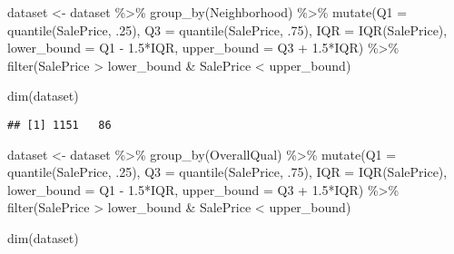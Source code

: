 \documentclass[
]{article}
\newenvironment{Shaded}{\begin{snugshade}}{\end{snugshade}}
\newcommand{\AttributeTok}[1]{\textcolor[rgb]{0.77,0.63,0.00}{#1}}
\newcommand{\DecValTok}[1]{\textcolor[rgb]{0.00,0.00,0.81}{#1}}
\newcommand{\FloatTok}[1]{\textcolor[rgb]{0.00,0.00,0.81}{#1}}
\newcommand{\FunctionTok}[1]{\textcolor[rgb]{0.00,0.00,0.00}{#1}}
\newcommand{\NormalTok}[1]{#1}
\newcommand{\OtherTok}[1]{\textcolor[rgb]{0.56,0.35,0.01}{#1}}
\newcommand{\SpecialCharTok}[1]{\textcolor[rgb]{0.00,0.00,0.00}{#1}}
\begin{document}
\begin{Shaded}
\begin{Highlighting}[]
\NormalTok{dataset }\OtherTok{\textless{}{-}}\NormalTok{ dataset }\SpecialCharTok{\%\textgreater{}\%} 
  \FunctionTok{group\_by}\NormalTok{(Neighborhood) }\SpecialCharTok{\%\textgreater{}\%} 
  \FunctionTok{mutate}\NormalTok{(}\AttributeTok{Q1 =} \FunctionTok{quantile}\NormalTok{(SalePrice, .}\DecValTok{25}\NormalTok{),}
         \AttributeTok{Q3 =} \FunctionTok{quantile}\NormalTok{(SalePrice, .}\DecValTok{75}\NormalTok{),}
         \AttributeTok{IQR =} \FunctionTok{IQR}\NormalTok{(SalePrice),}
         \AttributeTok{lower\_bound =}\NormalTok{ Q1 }\SpecialCharTok{{-}} \FloatTok{1.5}\SpecialCharTok{*}\NormalTok{IQR,}
         \AttributeTok{upper\_bound =}\NormalTok{ Q3 }\SpecialCharTok{+} \FloatTok{1.5}\SpecialCharTok{*}\NormalTok{IQR) }\SpecialCharTok{\%\textgreater{}\%}
  \FunctionTok{filter}\NormalTok{(SalePrice }\SpecialCharTok{\textgreater{}}\NormalTok{ lower\_bound }\SpecialCharTok{\&}\NormalTok{ SalePrice }\SpecialCharTok{\textless{}}\NormalTok{ upper\_bound)}

\FunctionTok{dim}\NormalTok{(dataset)}
\end{Highlighting}
\end{Shaded}

\begin{verbatim}
## [1] 1151   86
\end{verbatim}

\begin{Shaded}
\begin{Highlighting}[]
\NormalTok{dataset }\OtherTok{\textless{}{-}}\NormalTok{ dataset }\SpecialCharTok{\%\textgreater{}\%} 
  \FunctionTok{group\_by}\NormalTok{(OverallQual) }\SpecialCharTok{\%\textgreater{}\%} 
  \FunctionTok{mutate}\NormalTok{(}\AttributeTok{Q1 =} \FunctionTok{quantile}\NormalTok{(SalePrice, .}\DecValTok{25}\NormalTok{),}
         \AttributeTok{Q3 =} \FunctionTok{quantile}\NormalTok{(SalePrice, .}\DecValTok{75}\NormalTok{),}
         \AttributeTok{IQR =} \FunctionTok{IQR}\NormalTok{(SalePrice),}
         \AttributeTok{lower\_bound =}\NormalTok{ Q1 }\SpecialCharTok{{-}} \FloatTok{1.5}\SpecialCharTok{*}\NormalTok{IQR,}
         \AttributeTok{upper\_bound =}\NormalTok{ Q3 }\SpecialCharTok{+} \FloatTok{1.5}\SpecialCharTok{*}\NormalTok{IQR) }\SpecialCharTok{\%\textgreater{}\%}
  \FunctionTok{filter}\NormalTok{(SalePrice }\SpecialCharTok{\textgreater{}}\NormalTok{ lower\_bound }\SpecialCharTok{\&}\NormalTok{ SalePrice }\SpecialCharTok{\textless{}}\NormalTok{ upper\_bound)}

\FunctionTok{dim}\NormalTok{(dataset)}
\end{Highlighting}
\end{Shaded}
\end{document}
